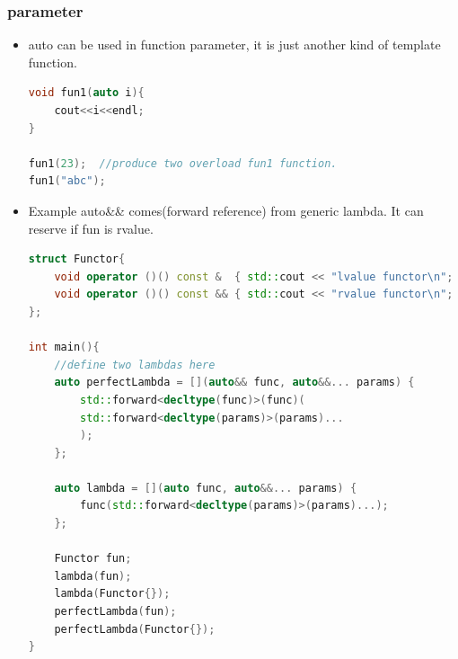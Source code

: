 \documentclass[a4paper,12pt,twoside]{book}
\begin{document}
\subsubsection{parameter}
\begin{itemize}
\item auto can be used in function parameter, it is just another kind of template function.
\begin{lstlisting}[frame=single, language=c++]
void fun1(auto i){
	cout<<i<<endl;
}

fun1(23);  //produce two overload fun1 function.
fun1("abc");
\end{lstlisting}

\item Example auto\&\& comes(forward reference) from generic lambda. It can reserve if fun is rvalue.
\begin{lstlisting}[frame=single, language=c++]
struct Functor{
	void operator ()() const &  { std::cout << "lvalue functor\n"; }
	void operator ()() const && { std::cout << "rvalue functor\n"; }
};

int main(){
	//define two lambdas here
	auto perfectLambda = [](auto&& func, auto&&... params) {
		std::forward<decltype(func)>(func)(
		std::forward<decltype(params)>(params)...
		);
	};

	auto lambda = [](auto func, auto&&... params) {
		func(std::forward<decltype(params)>(params)...);
	};

	Functor fun;
	lambda(fun);
	lambda(Functor{});
	perfectLambda(fun);
	perfectLambda(Functor{});
}
\end{lstlisting}
\end{itemize}
\end{document}
